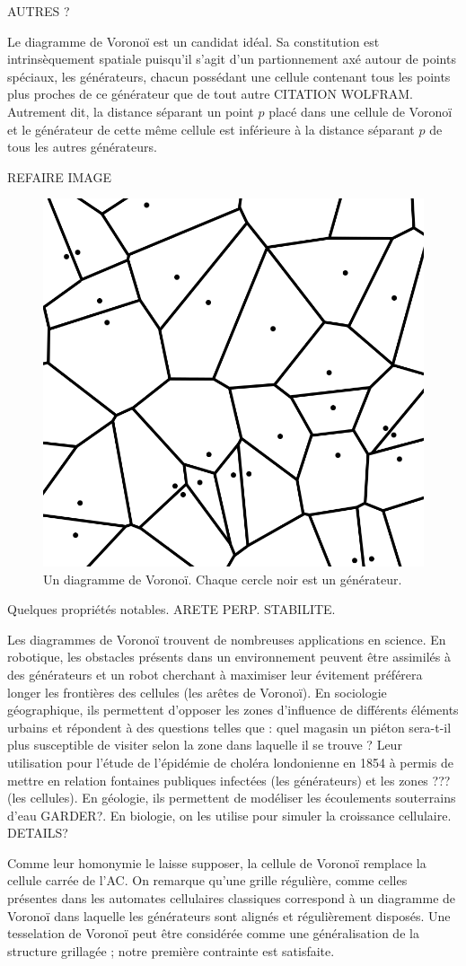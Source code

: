 \documentclass[12pt]{article}
\begin{document}
AUTRES ?

Le diagramme de Voronoï est un candidat idéal. Sa constitution est
intrinsèquement spatiale puisqu'il s'agit d'un partionnement axé
autour de points spéciaux, les générateurs, chacun possédant une
cellule contenant tous les points plus proches de ce générateur que de
tout autre CITATION WOLFRAM. Autrement dit, la distance séparant un
point $p$ placé dans une cellule de Voronoï et le générateur de cette
même cellule est inférieure à la distance séparant $p$ de tous les
autres générateurs.

REFAIRE IMAGE
\begin{figure}[h]
  \centering
  \includegraphics[width=0.5\linewidth]{images/voronoi.png}
  \caption{Un diagramme de Voronoï. Chaque cercle noir est un générateur.}
  \label{fig:voronoi}
\end{figure}

Quelques propriétés notables. ARETE PERP. STABILITE.

Les diagrammes de Voronoï trouvent de nombreuses applications en
science. En robotique, les obstacles présents dans un environnement
peuvent être assimilés à des générateurs et un robot cherchant à
maximiser leur évitement préférera longer les frontières des cellules
(les arêtes de Voronoï). En sociologie géographique, ils permettent
d'opposer les zones d'influence de différents éléments urbains et
répondent à des questions telles que : quel magasin un piéton
sera-t-il plus susceptible de visiter selon la zone dans laquelle il
se trouve ? Leur utilisation pour l'étude de l'épidémie de choléra
londonienne en 1854 à permis de mettre en relation fontaines publiques
infectées (les générateurs) et les zones ??? (les cellules). En
géologie, ils permettent de modéliser les écoulements souterrains
d'eau GARDER?. En biologie, on les utilise pour simuler la croissance
cellulaire. DETAILS?

Comme leur homonymie le laisse supposer, la cellule de Voronoï
remplace la cellule carrée de l'AC. On remarque qu'une grille
régulière, comme celles présentes dans les automates cellulaires
classiques correspond à un diagramme de Voronoï dans laquelle les
générateurs sont alignés et régulièrement disposés. Une tesselation de
Voronoï peut être considérée comme une généralisation de la structure
grillagée ; notre première contrainte est satisfaite.
\end{document}

